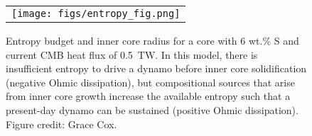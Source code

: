  \begin{figure}[h] %
   \centering
\begin{tabular}{c}
 \texttt{[image: figs/entropy\_fig.png]} 
\end{tabular}
\caption{Entropy budget and inner core radius for a core with 6 wt.\% S and
  current CMB heat flux of 0.5~TW. In this model, there is insufficient entropy to
  drive a dynamo before inner core solidification (negative Ohmic dissipation), but
  compositional sources that arise from inner core growth increase the available
entropy such that a present-day dynamo can be sustained (positive Ohmic dissipation).
Figure credit: Grace Cox. }
\label{entropy}
\end{figure}
